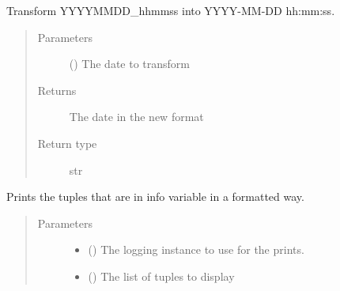 \documentclass[a4paper,10pt,english]{sphinxmanual}
\begin{document}

\begin{fulllineitems}
\label{\detokenize{commands/apidoc/src:src.parse_date}}
Transform YYYYMMDD\_hhmmss into YYYY-MM-DD hh:mm:ss.
\begin{quote}\begin{description}
\item[{Parameters}] \leavevmode
{} () \textendash{} The date to transform

\item[{Returns}] \leavevmode
The date in the new format

\item[{Return type}] \leavevmode
str

\end{description}\end{quote}

\end{fulllineitems}


\begin{fulllineitems}
\label{\detokenize{commands/apidoc/src:src.print_info}}
Prints the tuples that are in info variable in a formatted way.
\begin{quote}\begin{description}
\item[{Parameters}] \leavevmode\begin{itemize}
\item {} 
 () \textendash{} The logging instance to use for the prints.

\item {} 
 () \textendash{} The list of tuples to display

\end{itemize}

\end{description}\end{quote}

\end{fulllineitems}
\end{document}

